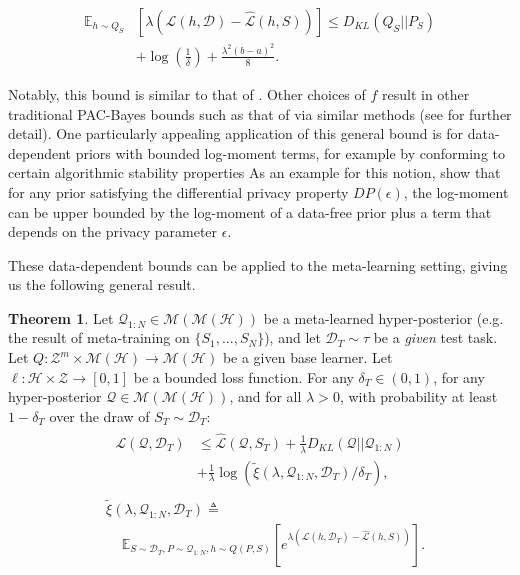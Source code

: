 \documentclass{article} %
\theoremstyle{definition}
\newtheorem{theorem}{Theorem}[section]
\newcommand{\Expect}[2]{\mathbb{E}_{#1}\left [#2 \right ]}
\begin{document}
\begin{align} 
    \mathbb{E}_{h\sim Q_S}&\left [\lambda(\mathcal{L}(h,\mathcal{D})-\hat{\mathcal{L}}(h, S))\right ]
     \leq D_{KL}(Q_S||P_S) \nonumber\\
    &+\log\left (\frac{1}{\delta}\right ) + \frac{\lambda^2(b-a)^2}{8} .
\end{align}

Notably, this bound is similar to that of \citet{Catoni2004}. Other choices of $f$ result in other traditional PAC-Bayes bounds such as that of \citet{Mcallester} via similar methods (see \citet{Rivasplata2020} for further detail). 
One particularly appealing application of this general bound is for data-dependent priors with bounded log-moment terms, for example by conforming to certain algorithmic stability properties 
As an example for this notion, \citet{Rivasplata2020} show that for any prior satisfying the differential privacy property $DP(\epsilon)$, the log-moment can be upper bounded by the log-moment of a data-free prior plus a term that depends on the privacy parameter $\epsilon$. 

These data-dependent bounds can be applied to the meta-learning setting, giving us the following general result. 
%
\begin{theorem} \label{thm:main-result}
	Let $\mathcal{Q}_{1:N}\in \mathcal{M}(\mathcal{M}(\mathcal{H}))$ be a meta-learned hyper-posterior (e.g. the result of meta-training on $\{S_1,...,S_N\}$), and let $\mathcal{D}_T\sim \tau$ be a \emph{given} test task. Let $Q: \mathcal{Z}^m\times\mathcal{M}(\mathcal{H})\rightarrow \mathcal{M}(\mathcal{H})$ be a given base learner. Let $\ell: \mathcal{H}\times \mathcal{Z}\rightarrow [0, 1]$ be a bounded loss function.
	For any $\delta_T \in (0,1)$, for any hyper-posterior $\mathcal{Q}\in \mathcal{M}(\mathcal{M}(\mathcal{H}))$, and for all $\lambda>0$, with probability at least $1-\delta_T$ over the draw of $S_T\sim \mathcal{D}_T$:
	\begin{align} \label{eq:main-result-generic}
	\begin{split}
	\mathcal{L}(\mathcal{Q}, \mathcal{D}_T) &\leq \hat{\mathcal{L}}(\mathcal{Q}, S_T) + \frac{1}{\lambda}D_{KL}(\mathcal{Q}||\mathcal{Q}_{1:N})\\
	&+\frac{1}{\lambda}\log\left ( \tilde{\xi}(\lambda,\mathcal{Q}_{1:N},\mathcal{D}_T)/\delta_T\right ) ,
	\end{split}
	\end{align}
%
	\begin{align*} 
	\begin{split}
	&\tilde{\xi}(\lambda,\mathcal{Q}_{1:N},\mathcal{D}_T)\triangleq \\
	&\;\;\;\; \Expect{S\sim \mathcal{D}_T, P\sim \mathcal{Q}_{1:N}, h\sim Q(P,S)}{e^{\lambda\left (\mathcal{L}(h, \mathcal{D}_T)-\hat{\mathcal{L}}(h, S)\right )}} .
	\end{split}
	\end{align*}
	

\end{theorem}
\end{document}
